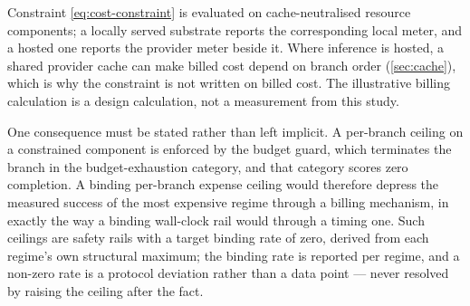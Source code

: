 Constraint \eqref{eq:cost-constraint} is evaluated on cache-neutralised resource
components; a locally served substrate reports the corresponding local meter, and
a hosted one reports the provider meter beside it.  Where inference is hosted, a
shared provider cache can make billed cost depend on branch order
(\cref{sec:cache}), which is why the constraint is not written on billed cost.
The illustrative billing calculation is a design calculation, not a measurement
from this study.

One consequence must be stated rather than left implicit.  A per-branch ceiling
on a constrained component is enforced by the budget guard, which terminates the
branch in the budget-exhaustion category, and that category scores zero
completion.  A binding per-branch expense ceiling would therefore depress the
measured success of the most expensive regime through a billing mechanism, in
exactly the way a binding wall-clock rail would through a timing one.  Such
ceilings are safety rails with a target binding rate of zero, derived from each
regime's own structural maximum; the binding rate is reported per regime, and a
non-zero rate is a protocol deviation rather than a data point --- never resolved
by raising the ceiling after the fact.
